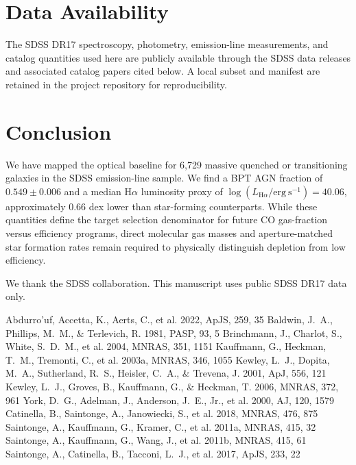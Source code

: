 \documentclass[twocolumn]{aastex631}
\begin{document}
\section{Data Availability}\label{sec:data-avail}
The SDSS DR17 spectroscopy, photometry, emission-line measurements, and catalog quantities used here are publicly available through the SDSS data releases and associated catalog papers cited below. A local subset and manifest are retained in the project repository for reproducibility.

\section{Conclusion}\label{sec:conclusion}
We have mapped the optical baseline for 6,729 massive quenched or transitioning galaxies in the SDSS emission-line sample. We find a BPT AGN fraction of $0.549 \pm 0.006$ and a median H$\alpha$ luminosity proxy of $\log(L_{\mathrm{H}\alpha} / \mathrm{erg~s}^{-1}) = 40.06$, approximately 0.66 dex lower than star-forming counterparts. While these quantities define the target selection denominator for future CO gas-fraction versus efficiency programs, direct molecular gas masses and aperture-matched star formation rates remain required to physically distinguish depletion from low efficiency.

\acknowledgments
We thank the SDSS collaboration. This manuscript uses public SDSS DR17 data only.


\begin{thebibliography}{}
 Abdurro'uf, Accetta, K., Aerts, C., et al. 2022, ApJS, 259, 35
 Baldwin, J.~A., Phillips, M.~M., \& Terlevich, R. 1981, PASP, 93, 5
 Brinchmann, J., Charlot, S., White, S.~D.~M., et al. 2004, MNRAS, 351, 1151
 Kauffmann, G., Heckman, T.~M., Tremonti, C., et al. 2003a, MNRAS, 346, 1055
 Kewley, L.~J., Dopita, M.~A., Sutherland, R.~S., Heisler, C.~A., \& Trevena, J. 2001, ApJ, 556, 121
 Kewley, L.~J., Groves, B., Kauffmann, G., \& Heckman, T. 2006, MNRAS, 372, 961
 York, D.~G., Adelman, J., Anderson, J.~E., Jr., et al. 2000, AJ, 120, 1579
 Catinella, B., Saintonge, A., Janowiecki, S., et al. 2018, MNRAS, 476, 875
 Saintonge, A., Kauffmann, G., Kramer, C., et al. 2011a, MNRAS, 415, 32
 Saintonge, A., Kauffmann, G., Wang, J., et al. 2011b, MNRAS, 415, 61
 Saintonge, A., Catinella, B., Tacconi, L.~J., et al. 2017, ApJS, 233, 22
\end{thebibliography}
\end{document}
